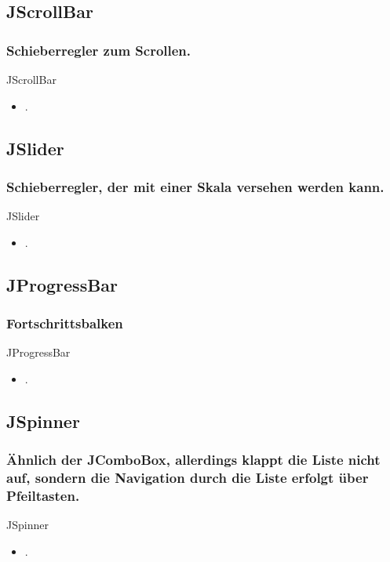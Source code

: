 \documentclass[xcolor=dvipsnames]{beamer}
\begin{document}
\subsection{JScrollBar}
\begin{frame} %
  \frametitle{Schieberregler zum Scrollen.
} %
  \begin{block}{JScrollBar}
	  \begin{itemize}
		\item .
	  \end{itemize}
  \end{block}
\end{frame}

\subsection{JSlider}
\begin{frame} %
  \frametitle{Schieberregler, der mit einer Skala versehen werden kann.
} %
  \begin{block}{JSlider}
	  \begin{itemize}
		\item .
	  \end{itemize}
  \end{block}
\end{frame}

\subsection{JProgressBar}
\begin{frame} %
  \frametitle{Fortschrittsbalken} %
  \begin{block}{JProgressBar}
	  \begin{itemize}
		\item .
	  \end{itemize}
  \end{block}
\end{frame}

\subsection{JSpinner}
\begin{frame} %
  \frametitle{Ähnlich der JComboBox, allerdings klappt die Liste nicht auf, sondern die Navigation durch die Liste erfolgt über Pfeiltasten.
} %
  \begin{block}{JSpinner}
	  \begin{itemize}
		\item .
	  \end{itemize}
  \end{block}
\end{frame}
\end{document}
